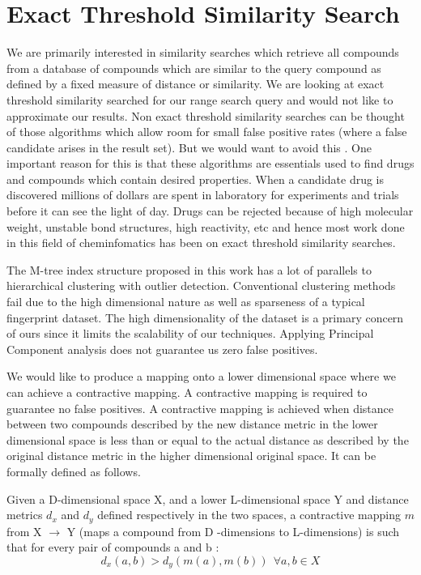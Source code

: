 \section{Exact Threshold Similarity Search}
\label{exact}
We are primarily interested in similarity searches which retrieve all compounds from a database of compounds which are similar to the query compound as defined by a fixed measure of distance or similarity. We are looking at exact threshold similarity searched for our range search query and would not like to approximate our results. Non exact threshold similarity searches can be thought of those algorithms which allow room for small false positive rates (where a false candidate arises in the result set). But we would want to avoid this . One important reason for this is that these algorithms are essentials used to find drugs and compounds which contain desired properties. When a candidate drug is discovered millions of dollars are spent in laboratory for experiments and trials before it can see the light of day. Drugs can be rejected because of high molecular weight, unstable bond structures, high reactivity, etc and hence most work done in this field of cheminfomatics has been on exact threshold similarity searches. 

The M-tree index structure proposed in this work has a lot of parallels to hierarchical clustering with outlier detection. Conventional clustering methods fail due to the high dimensional nature as well as sparseness of a typical fingerprint dataset. The high dimensionality of the dataset is a primary concern of ours since it limits the scalability of our techniques. Applying Principal Component analysis does not guarantee us zero false positives. 

We would like to produce a mapping onto a lower dimensional space where we can achieve a contractive mapping. A contractive mapping is required to guarantee no false positives. A contractive mapping is achieved when distance between two compounds described by the new distance metric in the lower dimensional space is less than or equal to the actual distance as described by the original distance metric in the higher dimensional original space. It can be formally defined as follows.

\begin{dfn}
 Given a D-dimensional space X, and a lower L-dimensional space Y and distance metrics $d_x$ and $d_y$ defined respectively in the two spaces, a contractive mapping $m$ from X $\rightarrow$ Y (maps a compound from D -dimensions to L-dimensions) is such that for every pair of compounds a and b : 
\begin{equation}
  d_x(a,b) > d_y(m(a),m(b))~~ \forall a,b \in X 
\end{equation}
\end{dfn}

